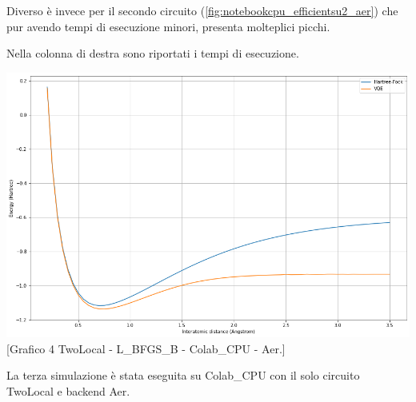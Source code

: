 Diverso è invece per il secondo circuito (\ref{fig:notebookcpu_efficientsu2_aer}) che pur avendo tempi di esecuzione minori, presenta molteplici picchi.
\begin{minipage}[b]{0.39\textwidth}
    \captionsetup{type=table}
    \caption[Risultati terza simulazione.]{Nella colonna di destra sono riportati i tempi di esecuzione.}
    \label{table:colabcpu_aer}
\end{minipage}
\hfill
\begin{minipage}[b]{0.57\textwidth}
    \centering
    \includegraphics[width=1.0\textwidth]{Images/Capitolo3/Plots/H2_twolocal_ry_rz_cz_aer_cpu_plot.png}
    [Grafico 4 \newline TwoLocal - L\_BFGS\_B - Colab\_CPU - Aer.]{}
    \label{fig:colabcpu_twolocal_aer}
\end{minipage}
\newline
La terza simulazione è stata eseguita su Colab\_CPU con il solo circuito TwoLocal e backend Aer.
